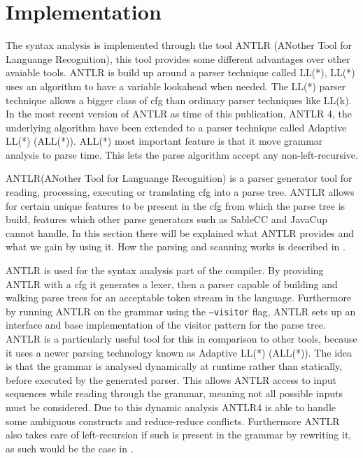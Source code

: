 \section{Implementation}

The syntax analysis is implemented through the tool ANTLR (ANother Tool for Languange Recognition), this tool provides some different advantages over other avaiable tools.
ANTLR is build up around  a parser technique called LL(*), LL(*) uses an algorithm to have a variable lookahead when needed.
The LL(*) parser technique allows a bigger class of \acrshort{cfg} than ordinary parser techniques like LL(k).
In the most recent version of ANTLR as time of this publication, ANTLR 4, the underlying algorithm have been extended to a parser technique called Adaptive LL(*) (ALL(*)).
ALL(*) most important feature is that it move grammar analysis to parse time. 
This lets the parse algorithm accept any non-left-recursive.
\citep{ALLSTAR, LLSTAR}	


ANTLR(ANother Tool for Languange Recognition) is a parser generator tool for reading, processing, executing or translating \gls{cfg} into a parse tree.
ANTLR allows for certain unique features to be present in the \gls{cfg} from which the parse tree is build, features which other parse generators such as SableCC and JavaCup cannot handle. %
In this section there will be explained what ANTLR provides and what we gain by using it.
How the parsing and scanning works is described in .

ANTLR is used for the syntax analysis part of the compiler.
By providing ANTLR with a \gls{cfg} it generates a lexer, then a parser capable of building and walking parse trees for an acceptable token stream in the language.
Furthermore by running ANTLR on the grammar using the \texttt{--visitor} flag, ANTLR sets up an interface and base implementation of the visitor pattern for the parse tree. 
ANTLR is a particularly useful tool for this in comparison to other tools, because it uses a newer parsing technology known as Adaptive LL(*) (ALL(*)).
The idea is that the grammar is analysed dynamically at runtime rather than statically, before executed by the generated parser.
This allows ANTLR access to input sequences while reading through the grammar, meaning not all possible inputs must be considered.
Due to this dynamic analysis ANTLR4 is able to handle some ambiguous constructs and reduce-reduce conflicts.
Furthermore ANTLR also takes care of left-recursion if such is present in the grammar by rewriting it, as such would be the case in .

